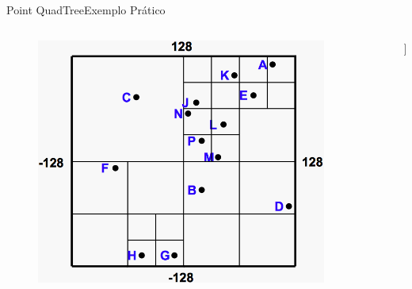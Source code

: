 \documentclass[red, tikz, aspectratio=169, xcolor=dvipsnames]{beamer}
\begin{document}
			
			\begin{frame}[fragile]{Point QuadTree}{Exemplo Prático}
				\centering
				\vspace{-40px}
				\begin{columns}
					\begin{column}{0.48\textwidth}
						\begin{figure}
							\centering
							\includegraphics[width=0.9\textwidth]{img/pr-quad.png}
						\end{figure}
					\end{column}
					\begin{column}{0.5\textwidth}
						\centering
						\fbox{
							\begin{forest}
								[\texttt{(x,y)}
								[NO]
								[NE]
								[SO]
								[SE]
								]
						\end{forest}}
						
						\begin{forest}
							[x
							[\texttt{C}
							]
							[\texttt{A}
							]
							[x]
							[\texttt{B}]
							]
						\end{forest}
						
						
					\end{column}
				\end{columns}
			\end{frame}
			
\end{document}
